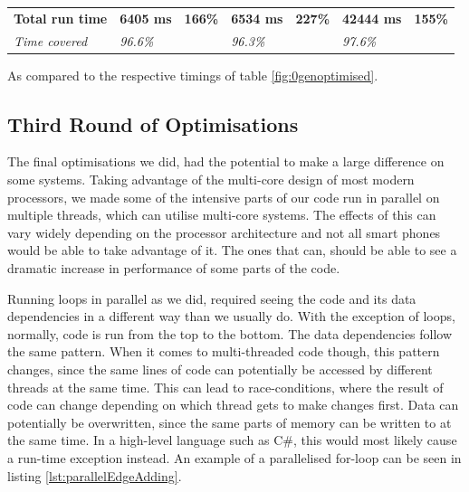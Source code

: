 \begin{table}[H]
\begin{tabular}{@{}lllllll@{}}
		\textbf{Total run time} & \textbf{6405 ms}                                                                          & \textbf{166\%}                                                                 & \textbf{6534 ms}                                                                           & \textbf{227\%}                                                                & \textbf{42444 ms}                                                                       & \textbf{155\%}                                                                \\
		\textit{Time covered}   & \textit{96.6\%}                                                                           & \textit{}                                                                      & \textit{96.3\%}                                                                            &                                                                               & \textit{97.6\%}                                                                         & \textit{}                                                                     \\ \bottomrule
	\end{tabular}
	\begin{tablenotes}
		\footnotesize{\item \textdagger As compared to the respective timings of table \ref{fig:0genoptimised}.}
	\end{tablenotes}
\end{table}

\subsection{Third Round of Optimisations}
The final optimisations we did, had the potential to make a large difference on some systems.
Taking advantage of the multi-core design of most modern processors, we made some of the intensive parts of our code run in parallel on multiple threads, which can utilise multi-core systems.
The effects of this can vary widely depending on the processor architecture and not all smart phones would be able to take advantage of it.
The ones that can, should be able to see a dramatic increase in performance of some parts of the code.

Running loops in parallel as we did, required seeing the code and its data dependencies in a different way than we usually do.
With the exception of loops, normally, code is run from the top to the bottom.
The data dependencies follow the same pattern.
When it comes to multi-threaded code though, this pattern changes, since the same lines of code can potentially be accessed by different threads at the same time.
This can lead to race-conditions, where the result of code can change depending on which thread gets to make changes first.
Data can potentially be overwritten, since the same parts of memory can be written to at the same time.
In a high-level language such as C\#, this would most likely cause a run-time exception instead.
An example of a parallelised for-loop can be seen in listing \ref{lst:parallelEdgeAdding}.

